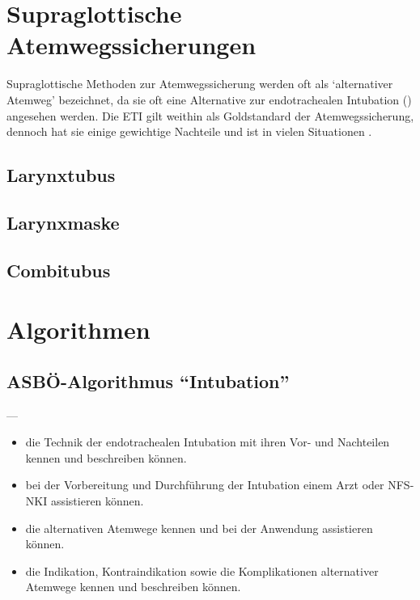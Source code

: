 \section{Supraglottische Atemwegssicherungen}

Supraglottische Methoden zur Atemwegssicherung werden oft
als \enquote*{alternativer Atemweg} bezeichnet, da sie oft
eine Alternative zur endotrachealen Intubation ()
angesehen werden. Die ETI gilt weithin als Goldstandard der
Atemwegssicherung, dennoch hat sie einige gewichtige
Nachteile und ist in vielen Situationen . 





\subsection{Larynxtubus{\texttrademark}}



\subsection{Larynxmaske}
\subsection{Combitubus}

\section{Algorithmen}
\subsection{ASBÖ-Algorithmus \enquote{Intubation}}
---
\begin{itemize}
  \item die Technik der endotrachealen Intubation mit ihren Vor-
  und Nachteilen kennen und beschreiben können.
  
  \item bei der Vorbereitung und Durchführung der Intubation
  einem Arzt oder NFS-NKI assistieren können. \item die
  alternativen Atemwege kennen und bei der Anwendung
  assistieren können.
  
  \item die Indikation, Kontraindikation sowie die Komplikationen
  alternativer Atemwege kennen und beschreiben können.
\end{itemize}


\ChapterEnd
